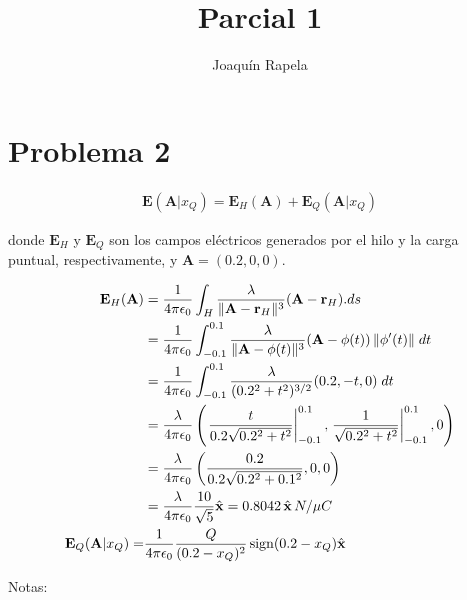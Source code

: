 \documentclass[12pt]{article}
\author{Joaquín Rapela}
\title{Parcial 1}
\DeclarePairedDelimiter{\norm}{\Vert}{\Vert}
\DeclareMathOperator{\sign}{sign}
\begin{document}
\maketitle

\section*{Problema 2}

\begin{align*}
    \mathbf{E}(\mathbf{A}|x_Q)=\mathbf{E}_H(\mathbf{A})+\mathbf{E}_Q(\mathbf{A}|x_Q)
\end{align*}

\noindent donde $\mathbf{E}_H$ y $\mathbf{E}_Q$ son los campos eléctricos
generados por el hilo y la carga puntual, respectivamente, y
$\mathbf{A}=(0.2,0,0)$.

\begin{align}
    \mathbf{E}_H(\mathbf{A})&=\frac{1}{4\pi\epsilon_0}\int_H\frac{\lambda}{\norm{\mathbf{A}-\mathbf{r}_H}^3}(\mathbf{A}-\mathbf{r}_H).ds\label{eq:E_H1}\\
                            &=\frac{1}{4\pi\epsilon_0}\int_{-0.1}^{0.1}\frac{\lambda}{\norm{\mathbf{A}-\phi(t)}^3}(\mathbf{A}-\phi(t))\,\norm{\phi'(t)}\;dt\label{eq:E_H2}\\
                            &=\frac{1}{4\pi\epsilon_0}\int_{-0.1}^{0.1}\frac{\lambda}{(0.2^2+t^2)^{3/2}}(0.2,-t,0)\;dt\label{eq:E_H3}\\
                            &=\frac{\lambda}{4\pi\epsilon_0}\left(\left.\frac{t}{0.2\sqrt{0.2^2+t^2}}\right|_{-0.1}^{0.1},\left.\frac{1}{\sqrt{0.2^2+t^2}}\right|_{-0.1}^{0.1},0\right)\label{eq:E_H4}\\
                            &=\frac{\lambda}{4\pi\epsilon_0}\left(\frac{0.2}{0.2\sqrt{0.2^2+0.1^2}},0,0\right)\nonumber\\
                            &=\frac{\lambda}{4\pi\epsilon_0}\frac{10}{\sqrt{5}}\hat{\mathbf{x}}\nonumber=0.8042\,\hat{\mathbf{x}}\,N/\mu C\\
    \mathbf{E}_Q(\mathbf{A}|x_Q)=&\frac{1}{4\pi\epsilon_0}\frac{Q}{(0.2-x_Q)^2}\sign(0.2-x_Q)\hat{\mathbf{x}}\label{eq:E_Q}
\end{align}

Notas:
\end{document}
